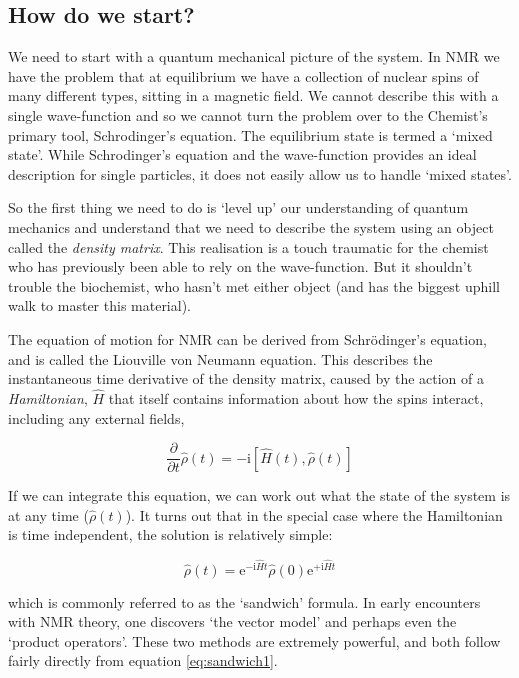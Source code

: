 \documentclass[notitlepage,11pt]{article}
\newcommand{\rmi}{\mathrm{i}}
\newcommand{\rme}{\mathrm{e}}
\begin{document}
\subsection{How do we start?}

We need to start with a quantum mechanical picture of the system. In NMR we have the problem that at equilibrium we have a collection of nuclear spins of many different types, sitting in a magnetic field. We cannot describe this with a single wave-function and so we cannot turn the problem over to the Chemist's primary tool, Schrodinger's equation. The equilibrium state is termed a `mixed state'. While Schrodinger's equation and the wave-function provides an ideal description for single particles, it does not easily allow us to handle `mixed states'. 

So the first thing we need to do is `level up' our understanding of quantum mechanics and understand that we need to describe the system using an object called the \emph{density matrix}. This realisation is a touch traumatic for the chemist who has previously been able to rely on the wave-function. But it shouldn't trouble the biochemist, who hasn't met either object (and has the biggest uphill walk to master this material).


The equation of motion for NMR can be derived from Schr\"odinger's equation, and is called the Liouville von Neumann equation. This describes the instantaneous time derivative of the density matrix, caused by the action of a \emph{Hamiltonian}, $\hat{H}$ that itself contains information about how the spins interact, including any external fields,

\begin{equation}
  \frac{\partial}{\partial t}\hat{\rho}(t)=-\rmi[\hat{H}(t),\hat{\rho}(t)]
  \label{eq:L}
\end{equation}

If we can integrate this equation, we can work out what the state of the system is at any time ($\hat{\rho}(t)$). It turns out that in the special case where the Hamiltonian is time independent, the solution is relatively simple:

\begin{equation}
  \hat{\rho}(t)=\rme^{-\rmi \hat{H}t}\hat{\rho}(0) \rme^{+\rmi \hat{H}t}
  \label{eq:sandwich1}
  \end{equation}

which is commonly referred to as the `sandwich' formula. In early encounters with NMR theory, one discovers `the vector model' and perhaps even the `product operators'. These two methods are extremely powerful, and both follow fairly directly from equation \ref{eq:sandwich1}.
\end{document}
